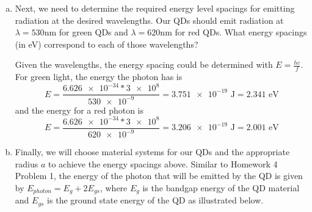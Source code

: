 \documentclass[10pt,letterpaper]{article}
\begin{document}
\begin{enumerate}
\begin{enumerate}[a)]
\begin{enumerate}[i)]

\item \textit{Condition \#1}: the wave function must be normalizable, requiring that it be finite on the domain $0 \leq r \leq \infty$. What does this condition require in terms of the constants A and/or B?

\color{violet}
The constants $A$ and $B$ must be the solutions to the Bessel and Neumann functions. This is given by Abel's identity. 
\color{black}

\item \textit{Condition \#2}: the wave function $R(r)$ must vanish at $r = a$ since the potential there is $\infty$. What constraint does this place on the quantity $kr$? \textit{Hint}: at what values fo $kr$ is $R$ zero?

\color{violet}
It depends on the root of the function, or the roots for $J_{n + \frac{1}{2}}(kr)$, so $kr$ could not ever 
\color{black}

\item Show that the expression for the energy levels in the spherical QD is
$$E_{n, l} = \frac{\hbar^{2}}{2ma^{2}}\zeta_{n, l}^{2}$$
where $\zeta_{n, l}$ is the $n^{th}$ zero of the $l^{th}$ order spherical Bessel function.

\color{violet}

\color{black}

\end{enumerate}

\item Next, we need to determine the required energy level spacings for emitting radiation at the desired wavelengths. Our QDs should emit radiation at $\lambda = 530$nm for green QDs and $\lambda = 620$nm for red QDs. What energy spacings (in eV) correspond to each of those wavelengths?

\color{violet}
Given the wavelengths, the energy spacing could be determined with $E = \frac{hc}{f}$. For green light, the energy the photon has is
$$E = \frac{\num{6.626e-34} * \num{3e8}}{\num{530e-9}} = \num{3.751e-19}\text{ J} = 2.341\text{ eV}$$
and the energy for a red photon is
$$E = \frac{\num{6.626e-34} * \num{3e8}}{\num{620e-9}} = \num{3.206e-19}\text{ J} = \num{2.001}\text{ eV}$$
\color{black}

\item Finally, we will choose material systems for our QDs and the appropriate radius $a$ to achieve the energy spacings above. Similar to Homework 4 Problem 1, the energy of the photon that will be emitted by the QD is given by $E_{photon} = E_{g} + 2E_{gs}$, where $E_{g}$ is the bandgap energy of the QD material and $E_{gs}$ is the ground state energy of the QD as illustrated below.


\end{enumerate}
\end{enumerate}
\end{document}
